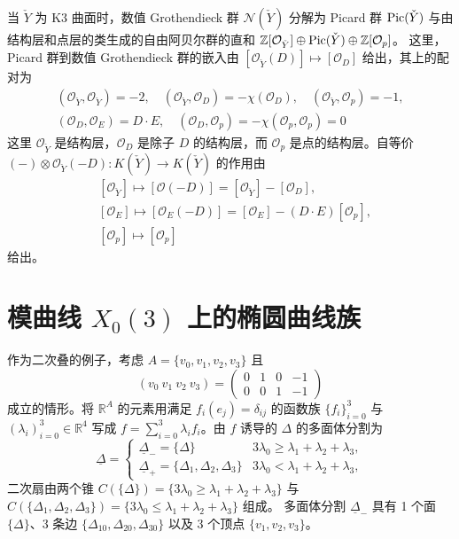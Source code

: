 当 $\check{Y}$ 为 K3 曲面时，数值 Grothendieck 群 $\mathcal{N}(\check{Y})$ 分解为 Picard 群
$\operatorname{Pic}(\check{Y})$ 与由结构层和点层的类生成的自由阿贝尔群的直和
$\mathbb{Z}[\mathcal{O}_{\check{Y}}]\oplus\operatorname{Pic}(\check{Y})\oplus\mathbb{Z}[\mathcal{O}_{p}]$。
这里，Picard 群到数值 Grothendieck 群的嵌入由 $[\mathcal{O}_{\check{Y}}(D)]\mapsto[\mathcal{O}_{D}]$
给出，其上的配对为
\begin{gather}
  (\mathcal{O}_{\check{Y}},\mathcal{O}_{\check{Y}})=-2,\quad
  (\mathcal{O}_{\check{Y}},\mathcal{O}_{D})=-\chi(\mathcal{O}_{D}),\quad
  (\mathcal{O}_{\check{Y}},\mathcal{O}_{p})=-1, \tag{6.5}\\
  (\mathcal{O}_{D},\mathcal{O}_{E})=D\cdot E,\quad
  (\mathcal{O}_{D},\mathcal{O}_{p})=-\chi(\mathcal{O}_{p},\mathcal{O}_{p})=0 \tag{6.6}
\end{gather}
这里 $\mathcal{O}_{\check{Y}}$ 是结构层，$\mathcal{O}_{D}$ 是除子 $D$ 的结构层，而
$\mathcal{O}_{p}$ 是点的结构层。自等价
$(-)\otimes\mathcal{O}_{\check{Y}}(-D)\colon K(\check{Y})\to K(\check{Y})$ 的作用由
\begin{align}
  &[\mathcal{O}_{\check{Y}}]\mapsto[\mathcal{O}(-D)]=[\mathcal{O}_{\check{Y}}]-[\mathcal{O}_{D}], \tag{6.7}\\
  &[\mathcal{O}_{E}]\mapsto[\mathcal{O}_{E}(-D)]=[\mathcal{O}_{E}]-(D\cdot E)[\mathcal{O}_{p}], \tag{6.8}\\
  &[\mathcal{O}_{p}]\mapsto[\mathcal{O}_{p}] \tag{6.9}
\end{align}
给出。


\section{模曲线 $X_{0}(3)$ 上的椭圆曲线族}

作为二次叠的例子，考虑 $A=\{v_{0},v_{1},v_{2},v_{3}\}$ 且
\begin{equation}
  (v_{0}\ v_{1}\ v_{2}\ v_{3})=\begin{pmatrix}0&1&0&-1\\0&0&1&-1\end{pmatrix} \tag{7.1}
\end{equation}
成立的情形。将 $\mathbb{R}^{A}$ 的元素用满足 $f_{i}(e_{j})=\delta_{ij}$ 的函数族
$\{f_{i}\}_{i=0}^{3}$ 与 $(\lambda_{i})_{i=0}^{3}\in\mathbb{R}^{4}$ 写成
$f=\sum_{i=0}^{3}\lambda_{i}f_{i}$。由 $f$ 诱导的 $\Delta$ 的多面体分割为
\begin{equation}
  \underline{\Delta}=
  \begin{cases}
    \underline{\Delta}_{-}=\{\Delta\} & 3\lambda_{0}\ge\lambda_{1}+\lambda_{2}+\lambda_{3},\\
    \underline{\Delta}_{+}=\{\Delta_{1},\Delta_{2},\Delta_{3}\} & 3\lambda_{0}<\lambda_{1}+\lambda_{2}+\lambda_{3},
  \end{cases} \tag{7.2}
\end{equation}
二次扇由两个锥 $C(\{\Delta\})=\{3\lambda_{0}\ge\lambda_{1}+\lambda_{2}+\lambda_{3}\}$ 与
$C(\{\Delta_{1},\Delta_{2},\Delta_{3}\})=\{3\lambda_{0}\le\lambda_{1}+\lambda_{2}+\lambda_{3}\}$ 组成。
多面体分割 $\underline{\Delta}_{-}$ 具有 1 个面 $\{\Delta\}$、3 条边
$\{\Delta_{10},\Delta_{20},\Delta_{30}\}$ 以及 3 个顶点 $\{v_{1},v_{2},v_{3}\}$。


